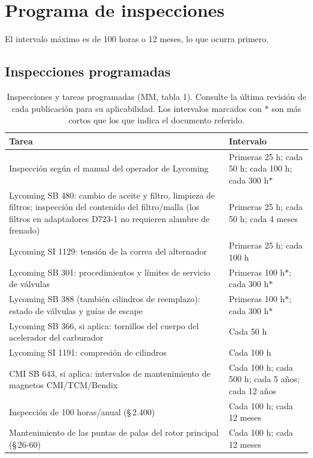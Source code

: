 \chapter{Programa de inspecciones}
\label{cap:mm-inspecciones}

\opening{El intervalo máximo es de 100 horas o 12 meses, lo que ocurra primero.}

\section{Inspecciones programadas}

\begin{table}[htbp]
\centering\scriptsize
\caption{Inspecciones y tareas programadas (MM, tabla 1). Consulte la última revisión de cada publicación para su aplicabilidad. Los intervalos marcados con $\ast$ son más cortos que los que indica el documento referido.}
\label{tab:mm-programadas}
\setlength{\tabcolsep}{2.5pt}
\begin{tabularx}{\linewidth}{@{}Y>{\raggedright\arraybackslash}p{2.7cm}@{}}
\toprule
Tarea & Intervalo \\
\midrule
Inspección según el manual del operador de Lycoming & Primeras 25 h; cada 50 h; cada 100 h; cada 300 h$\ast$ \\
Lycoming SB 480: cambio de aceite y filtro, limpieza de filtros; inspección del contenido del filtro/malla (los filtros en adaptadores D723-1 no requieren alambre de frenado) & Primeras 25 h; cada 50 h; cada 4 meses \\
Lycoming SI 1129: tensión de la correa del alternador & Primeras 25 h; cada 100 h \\
Lycoming SB 301: procedimientos y límites de servicio de válvulas & Primeras 100 h$\ast$; cada 300 h$\ast$ \\
Lycoming SB 388 (también cilindros de reemplazo): estado de válvulas y guías de escape & Primeras 100 h$\ast$; cada 300 h$\ast$ \\
Lycoming SB 366, si aplica: tornillos del cuerpo del acelerador del carburador & Cada 50 h \\
Lycoming SI 1191: compresión de cilindros & Cada 100 h \\
CMI SB 643, si aplica: intervalos de mantenimiento de magnetos CMI/TCM/Bendix & Cada 100 h; cada 500 h; cada 5 años; cada 12 años \\
Inspección de 100 horas/anual (\S\,2.400) & Cada 100 h; cada 12 meses \\
Mantenimiento de las puntas de palas del rotor principal (\S\,26-60) & Cada 100 h; cada 12 meses \\

\end{tabularx}
\end{table}
